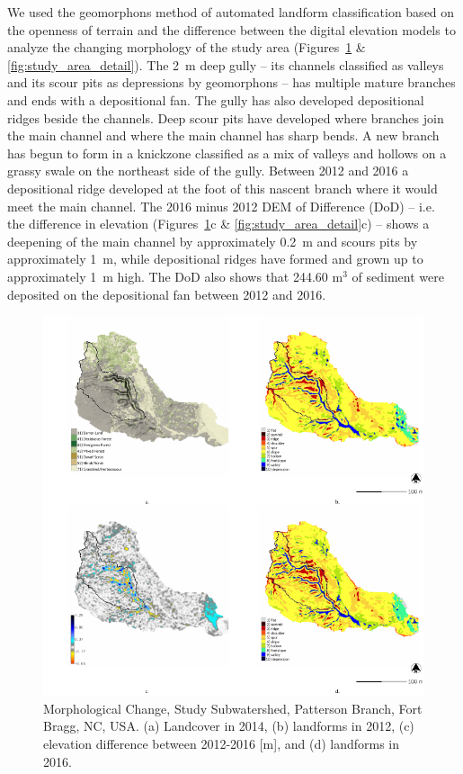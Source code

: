 \documentclass[gmd, manuscript]{copernicus}
\begin{document}
We used the geomorphons method 
of automated landform classification
based on the openness of terrain \citep{Jasiewicz2013}
and the difference between the digital elevation models 
to analyze the changing morphology of the study area
(Figures~\ref{fig:study_area} \& \ref{fig:study_area_detail}). 
%
The 2~\unit{m} deep gully -- 
its channels classified as valleys and 
its scour pits as depressions by geomorphons -- 
has multiple mature branches
and ends with a depositional fan.
%
The gully has also developed 
depositional ridges beside the channels.
Deep scour pits have developed 
where branches join the main channel 
and where the main channel has sharp bends.
%
A new branch has begun to form 
in a knickzone classified as a mix of valleys and hollows
on a grassy swale on the northeast side of the gully.
Between 2012 and 2016 a depositional ridge
developed at the foot of this nascent branch
where it would meet the main channel. 
%
The 2016 minus 2012 DEM of Difference (DoD) -- 
i.e.~ the difference in elevation 
(Figures~\ref{fig:study_area}c \& \ref{fig:study_area_detail}c) --
shows a deepening of the main channel 
by approximately 0.2~\unit{m} 
and scours pits by approximately 1~\unit{m},
while depositional ridges have formed and grown up to
approximately 1~\unit{m} high.
%
The DoD also shows that
244.60 \unit{m}$^3$ of sediment were deposited
on the depositional fan between 2012 and 2016.

\begin{figure}
\center
\includegraphics[width=\textwidth,height=0.95\textheight,keepaspectratio]{figures/study_area.pdf}
\caption{Morphological Change, Study Subwatershed, Patterson Branch, Fort Bragg, NC, USA.
(a) Landcover in 2014, 
(b) landforms in 2012,
(c) elevation difference between 2012-2016 [m], and
(d) landforms in 2016.
}
\label{fig:study_area}
\end{figure}
\end{document}
